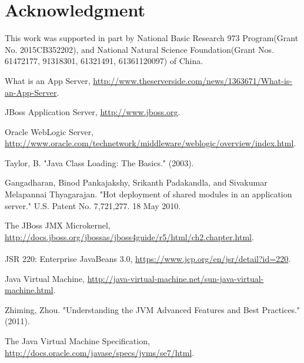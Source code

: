 \documentclass[conference]{IEEEtran}
\begin{document}
\section*{Acknowledgment}
This work was supported in part by National Basic Research 973 Program(Grant No. 2015CB352202), and National Natural Science Foundation(Grant Nos. 61472177, 91318301, 61321491, 61361120097) of China.




\begin{thebibliography}{9}

What is an App Server, \url{http://www.theserverside.com/news/1363671/What-is-an-App-Server}.

JBoss Application Server, \url{http://www.jboss.org}.

Oracle WebLogic Server, \url{http://www.oracle.com/technetwork/middleware/weblogic/overview/index.html}.


Taylor, B. "Java Class Loading: The Basics." (2003).

Gangadharan, Binod Pankajakshy, Srikanth Padakandla, and Sivakumar Melapannai Thyagarajan. "Hot deployment of shared modules in an application server." U.S. Patent No. 7,721,277. 18 May 2010.

The JBoss JMX Microkernel, \url{http://docs.jboss.org/jbossas/jboss4guide/r5/html/ch2.chapter.html}.

JSR 220: Enterprise JavaBeans\textsuperscript{\texttrademark} 3.0, \url{https://www.jcp.org/en/jsr/detail?id=220}.

Java Virtual Machine, \url{http://java-virtual-machine.net/sun-java-virtual-machine.html}.

Zhiming, Zhou. "Understanding the JVM Advanced Features and Best Practices." (2011).

The Java Virtual Machine Specification, \url{http://docs.oracle.com/javase/specs/jvms/se7/html}.


\end{thebibliography}
\end{document}
